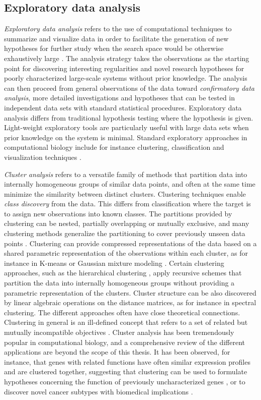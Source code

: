 \subsection{Exploratory data analysis}

{\it Exploratory data analysis} refers to the use of computational
techniques to summarize and visualize data in order to facilitate the
generation of new hypotheses for further study when the search space
would be otherwise exhaustively large \citep{Tukey77}. The analysis
strategy takes the observations as the starting point for discovering
interesting regularities and novel research hypotheses for poorly
characterized large-scale systems without prior knowledge. The
analysis can then proceed from general observations of the data toward
\emph{confirmatory data analysis}, more detailed investigations and
hypotheses that can be tested in independent data sets with standard
statistical procedures. Exploratory data analysis differs from
traditional hypothesis testing where the hypothesis is
given. Light-weight exploratory tools are particularly useful with
large data sets when prior knowledge on the system is
minimal. Standard exploratory approaches in computational biology
include for instance clustering, classification and visualization
techniques \citep{Evanko10, Polanski07}.

{\it Cluster analysis} refers to a versatile family of methods that
partition data into internally homogeneous groups of similar data
points, and often at the same time minimize the similarity between
distinct clusters. Clustering techniques enable {\it class discovery}
from the data. This differs from classification where the target is to
assign new observations into known classes. The partitions provided by
clustering can be nested, partially overlapping or mutually exclusive,
and many clustering methods generalize the partitioning to cover
previously unseen data points \citep{Jain88}.  Clustering can provide
compressed representations of the data based on a shared parametric
representation of the observations within each cluster, as for
instance in K-means or Gaussian mixture modeling \citep[see
e.g.][]{Bishop06}. Certain clustering approaches, such as the
hierarchical clustering \citep[see e.g.][]{Hastie09}, apply recursive
schemes that partition the data into internally homogeneous groups
without providing a parametric representation of the clusters.
Cluster structure can be also discovered by linear algebraic
operations on the distance matrices, as for instance in spectral
clustering. The different approaches often have close theoretical
connections. Clustering in general is an ill-defined concept that
refers to a set of related but mutually incompatible objectives
\citep{Ben-David08, Kleinberg02nips}. Cluster analysis has been
tremendously popular in computational biology, and a comprehensive
review of the different applications are beyond the scope of this
thesis. It has been observed, for instance, that genes with related
functions have often similar expression profiles and are clustered
together, suggesting that clustering can be used to formulate
hypotheses concerning the function of previously uncharacterized genes
\citep{DeRisi97, Eisen98}, or to discover novel cancer subtypes with
biomedical implications \citep{Sorlie01}.


